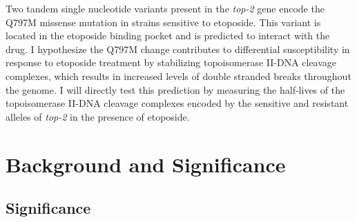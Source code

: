 \documentclass[12pt]{article}
\begin{document}
 Two tandem single nucleotide variants present in the {\it top-2} gene encode the Q797M missense mutation in strains sensitive to etoposide. This variant is located in the etoposide binding pocket and is predicted to interact with the drug. I hypothesize the Q797M change contributes to differential susceptibility in response to etoposide treatment by stabilizing topoisomerase II-DNA cleavage complexes, which results in increased levels of double stranded breaks throughout the genome. I will directly test this prediction by measuring the half-lives of the topoisomerase II-DNA cleavage complexes encoded by the sensitive and resistant alleles of {\it top-2} in the presence of etoposide.




\newpage






\section{Background and Significance}


\subsection{Significance}
\end{document}

